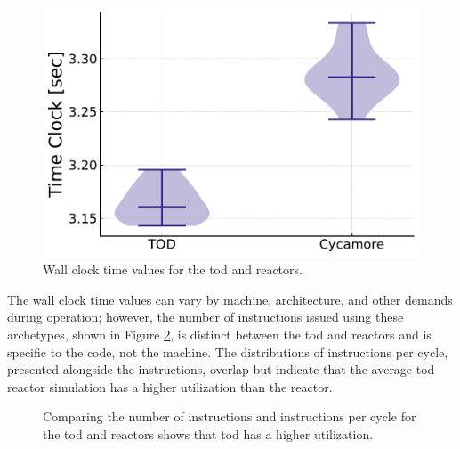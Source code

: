 \begin{figure}[H]
    \centering
    \includegraphics[width=0.7\linewidth]{images/power_reactor/time_clock_violin.pdf}
    \caption{Wall clock time values for the \gls{tod} and \cycamore reactors.}
    \label{fig:time_violin}
\end{figure}

The wall clock time values can vary by machine, architecture, and other demands during operation; however, the number of instructions issued using these archetypes, shown in Figure \ref{fig:isn_violin}, is distinct between the \gls{tod} and \cycamore reactors and is specific to the code, not the machine. The distributions of instructions per cycle, presented alongside the instructions, overlap but indicate that the average \gls{tod} reactor simulation has a higher utilization than the \cycamore reactor.

\begin{figure}[H]
    \hfill
    \caption{Comparing the number of instructions and instructions per cycle for the \gls{tod} and \cycamore reactors shows that \gls{tod} has a higher utilization.}
    \label{fig:isn_violin}
\end{figure}
